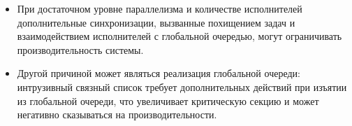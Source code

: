 \begin{itemize}
    \item При достаточном уровне параллелизма и количестве исполнителей дополнительные синхронизации, вызванные похищением задач и взаимодействием исполнителей с глобальной очередью, могут ограничивать производительность системы.
    \item Другой причиной может являться реализация глобальной очереди: интрузивный связный список требует дополнительных действий при изъятии из глобальной очереди, что увеличивает критическую секцию и может негативно сказываться на производительности.
\end{itemize}

